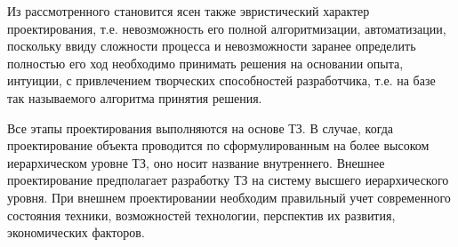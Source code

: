 Из рассмотренного становится ясен также эвристический характер проектирования, т.е. невозможность его полной алгоритмизации, автоматизации, поскольку ввиду сложности процесса и невозможности заранее определить полностью его ход необходимо принимать решения на основании опыта, интуиции, с привлечением творческих способностей разработчика, т.е. на базе так называемого алгоритма принятия решения. 

Все этапы проектирования выполняются на основе ТЗ. В случае, когда проектирование объекта проводится по сформулированным на более высоком иерархическом уровне ТЗ, оно носит название внутреннего. Внешнее проектирование предполагает разработку ТЗ на систему высшего иерархического уровня. При внешнем проектировании необходим правильный учет современного состояния техники, возможностей технологии, перспектив их развития, экономических факторов.